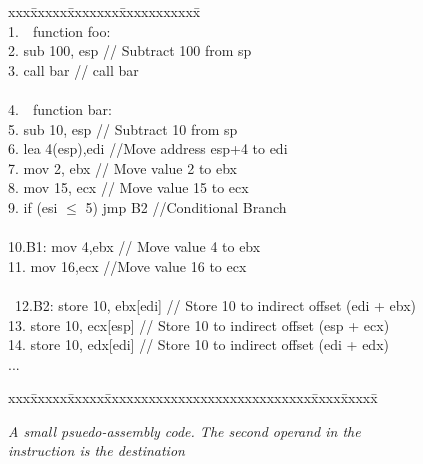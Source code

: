 
\begin{figure*}[t]
{
\vspace{-0.2in}
{
\begin{minipage}[t]{.44\linewidth}
{
\centering
\begin{scriptsize}
\begin{tabbing}

xxx\=xxxxx\=xxxxxxx\=xxxxxxxxxxx\=  \kill\\

1.\ \ function foo:\\
2.\> \>sub 100, esp   \>\>// Subtract 100 from sp \\
3.\> \>call bar   \>\>// call bar \\
\\
4.\ \ function bar: \\
5.\>\> sub 10, esp  \> \>// Subtract 10 from sp \\
6.\>\> lea  4(esp),edi  \> \>//Move address esp+4 to edi \\
7.\> \>mov  2, ebx   \> \>// Move value 2 to ebx\\
8.\> \>mov  15, ecx  \> \>// Move value 15 to ecx\\
9.\>\> if (esi $\leq$ 5) jmp B2 \>\>//Conditional Branch\\
\\
10.\>B1:\> mov 4,ebx \>\> // Move value 4 to ebx\\
11.\>\> mov 16,ecx \>\> //Move value 16 to ecx\\
\\\
12.\>B2:\> store 10, ebx[edi] \>\>// Store 10 to indirect offset (edi + ebx)\\
13.\>\> store 10, ecx[esp] \>\>// Store 10 to indirect offset (esp + ecx)\\
14.\>\> store 10, edx[edi] \>\>// Store 10 to indirect offset (edi + edx)\\
...
\end{tabbing}
\end{scriptsize}
\vspace{-.2in}
\caption {\textit{A small psuedo-assembly code. The second operand in the instruction is the destination}}
\label{fig:argcodeex}
}
\end{minipage} 
\hfill
\begin{minipage}[t]{.5\linewidth}
{
\centering
\begin{scriptsize}
\begin{tabbing}
xxx\=xxxxx\=xxxxx\=xxxxxxxxxxxxxxxxxxxxxxxxxxxx\=xxxx\=xxxxx\=  \kill\\


\end{tabbing}
\end{scriptsize}}
\end{minipage}}}
\end{figure*}
